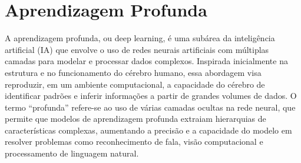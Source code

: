 










\section{Aprendizagem Profunda}
\label{sec:dl}

A aprendizagem profunda, ou deep learning, é uma subárea da inteligência artificial (IA) que envolve o uso de redes neurais artificiais com múltiplas camadas para modelar e processar dados complexos. Inspirada inicialmente na estrutura e no funcionamento do cérebro humano, essa abordagem visa reproduzir, em um ambiente computacional, a capacidade do cérebro de identificar padrões e inferir informações a partir de grandes volumes de dados. O termo ``profunda'' refere-se ao uso de várias camadas ocultas na rede neural, que permite que modelos de aprendizagem profunda extraiam hierarquias de características complexas, aumentando a precisão e a capacidade do modelo em resolver problemas como reconhecimento de fala, visão computacional e processamento de linguagem natural.


